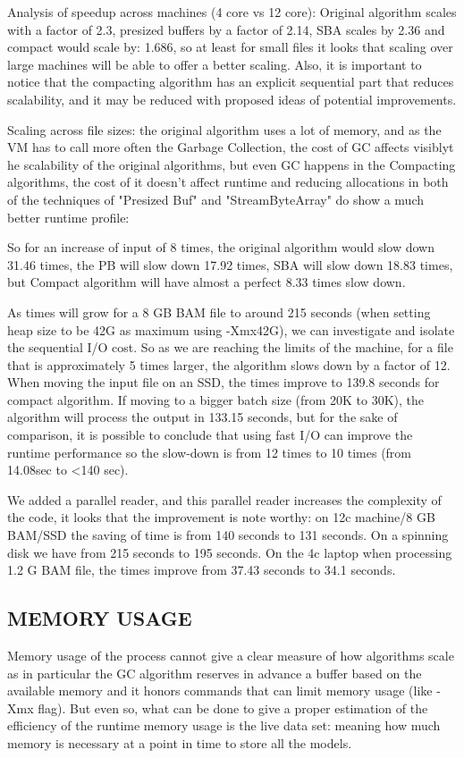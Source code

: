 \documentclass[a4paper,twoside]{article}
\begin{document}
Analysis of speedup across machines (4 core vs 12 core):
Original algorithm scales with a factor of 2.3, presized buffers by a factor of 2.14, SBA scales by 2.36
and compact would scale by: 1.686, so at least for small files it looks that scaling over large machines will be able to offer a better scaling. Also, it is important to notice that the compacting algorithm has an explicit sequential part that reduces scalability, and it may be reduced with proposed ideas 
of potential improvements.

Scaling across file sizes: the original algorithm uses a lot of memory, and as the VM has to call more often the Garbage Collection, the cost of GC affects visiblyt he scalability of the original algorithms, but even GC happens in the Compacting algorithms, the cost of it doesn't affect runtime and reducing allocations in both of the techniques of "Presized Buf" and "StreamByteArray" do show a much better runtime profile:

So for an increase of input of 8 times, the original algorithm would slow down 31.46 times, the PB will slow down 17.92 times, SBA will slow down 18.83 times, but Compact algorithm will have almost a perfect 8.33 times slow down.

As times will grow for a 8 GB BAM file to around 215 seconds (when setting heap size to be 42G as maximum using -Xmx42G), we can investigate and isolate the sequential I/O cost. So as we are reaching the limits of the machine, for a file that is approximately 5 times larger, the algorithm slows down by a factor of 12. When moving the input file on an SSD, the times improve to 139.8 seconds for compact algorithm. If moving to a bigger batch size (from 20K to 30K), the algorithm will process the output in 133.15 seconds, but for the sake of comparison, it is possible to conclude that using fast I/O can improve the runtime performance so the slow-down is from 12 times to 10 times (from 14.08sec to <140 sec).

We added a parallel reader, and this parallel reader increases the complexity of the code, it looks that the improvement is note worthy: on 12c machine/8 GB BAM/SSD the saving of time is from 140 seconds to 131 seconds. On a spinning disk we have from 215 seconds to 195 seconds. On the 4c laptop when processing 1.2 G BAM file, the times improve from 37.43 seconds to 34.1 seconds.



\subsection{\uppercase{Memory Usage}}
Memory usage of the process cannot give a clear measure of how algorithms scale as in particular the GC algorithm reserves in advance a buffer based on the available memory and it honors commands that can limit memory usage (like -Xmx flag). But even so, what can be done to give a proper estimation of the efficiency of the runtime memory usage is the live data set: meaning how much memory is necessary at a point in time to store all the models.
\end{document}

